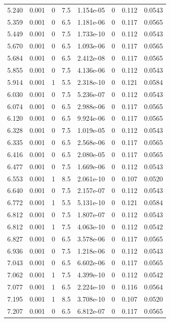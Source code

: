 \documentclass[preview]{standalone}
\begin{document}
{{{\begin{tabular}{L{1.2cm}C{1.2cm} C{0.3cm}C{0.5cm} C{1.4cm}C{1.4cm} C{1.4cm}C{1.4cm}}
  5.240  &  0.001  & 0     & 7.5 &  1.154e-05  & 0  & 0.112 &  0.0543   \\ 
  5.359  &  0.001  & 0     & 6.5 &  1.181e-06  & 0  & 0.117 &  0.0565   \\ 
  5.449  &  0.001  & 0     & 7.5 &  1.733e-10  & 0  & 0.112 &  0.0543   \\ 
  5.670  &  0.001  & 0     & 6.5 &  1.093e-06  & 0  & 0.117 &  0.0565   \\ 
  5.684  &  0.001  & 0     & 6.5 &  2.412e-08  & 0  & 0.117 &  0.0565   \\ 
  5.855  &  0.001  & 0     & 7.5 &  4.136e-06  & 0  & 0.112 &  0.0543   \\ 
  5.914  &  0.001  & 1     & 5.5 &  2.318e-10  & 0  & 0.121 &  0.0584   \\ 
  6.030  &  0.001  & 0     & 7.5 &  5.236e-07  & 0  & 0.112 &  0.0543   \\ 
  6.074  &  0.001  & 0     & 6.5 &  2.988e-06  & 0  & 0.117 &  0.0565   \\ 
  6.120  &  0.001  & 0     & 6.5 &  9.924e-06  & 0  & 0.117 &  0.0565   \\ 
  6.328  &  0.001  & 0     & 7.5 &  1.019e-05  & 0  & 0.112 &  0.0543   \\ 
  6.335  &  0.001  & 0     & 6.5 &  2.568e-06  & 0  & 0.117 &  0.0565   \\ 
  6.416  &  0.001  & 0     & 6.5 &  2.080e-05  & 0  & 0.117 &  0.0565   \\ 
  6.477  &  0.001  & 0     & 7.5 &  1.669e-06  & 0  & 0.112 &  0.0543   \\ 
  6.553  &  0.001  & 1     & 8.5 &  2.061e-10  & 0  & 0.107 &  0.0520   \\ 
  6.640  &  0.001  & 0     & 7.5 &  2.157e-07  & 0  & 0.112 &  0.0543   \\ 
  6.772  &  0.001  & 1     & 5.5 &  5.131e-10  & 0  & 0.121 &  0.0584   \\ 
  6.812  &  0.001  & 0     & 7.5 &  1.807e-07  & 0  & 0.112 &  0.0543   \\ 
  6.812  &  0.001  & 1     & 7.5 &  4.063e-10  & 0  & 0.112 &  0.0542   \\ 
  6.827  &  0.001  & 0     & 6.5 &  3.578e-06  & 0  & 0.117 &  0.0565   \\ 
  6.936  &  0.001  & 0     & 7.5 &  1.218e-06  & 0  & 0.112 &  0.0543   \\ 
  7.043  &  0.001  & 0     & 6.5 &  6.602e-06  & 0  & 0.117 &  0.0565   \\ 
  7.062  &  0.001  & 1     & 7.5 &  4.399e-10  & 0  & 0.112 &  0.0542   \\ 
  7.077  &  0.001  & 1     & 6.5 &  2.224e-10  & 0  & 0.116 &  0.0564   \\ 
  7.195  &  0.001  & 1     & 8.5 &  3.708e-10  & 0  & 0.107 &  0.0520   \\ 
  7.207  &  0.001  & 0     & 6.5 &  6.812e-07  & 0  & 0.117 &  0.0565   \\ 
\hline 
\end{tabular} 

}}}
\end{document}
